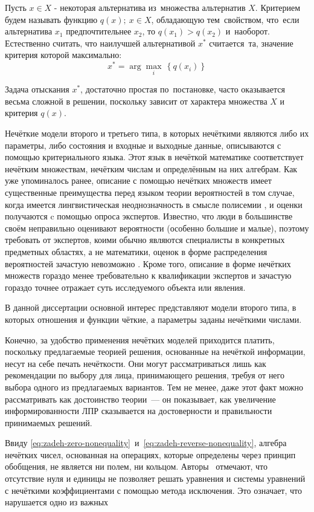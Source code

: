 Пусть $x\in X$ - некоторая альтернатива из~множества альтернатив $X$. Критерием будем называть функцию $q\left( x \right);\ x\in X$, обладающую тем~свойством, что~если альтернатива ${x_1}$ предпочтительнее ${x_2}$, то $q\left( x_1 \right)>q\left( x_2 \right)$ и~наоборот. Естественно считать, что наилучшей альтернативой ${{x}^{*}}$ считается~та, значение критерия которой максимально:
\[
	x^{*}=\arg \underset{i}{\mathop{\max }}\,\left\{ q\left( x_i \right) \right\}
\]

Задача отыскания $x^{*}$, достаточно простая по~постановке, часто оказывается весьма сложной в решении, поскольку зависит от характера множества $X$ и критерия $q\left( x \right)$. 

Нечёткие модели второго и третьего типа, в которых нечёткими являются либо их параметры, либо состояния и входные и выходные данные, описываются с помощью критериального языка. Этот язык в нечёткой математике соответствует нечётким множествам, нечётким числам и определённым на них алгебрам. Как уже упоминалось ранее, описание с помощью нечётких множеств имеет существенные преимущества перед языком теории вероятностей в том случае, когда имеется лингвистическая неоднозначность в смысле полисемии \cite{Borisov_Alexeev_Msk}, и оценки получаются c помощью опроса экспертов. Известно, что люди в большинстве своём неправильно оценивают вероятности (особенно большие и малые), поэтому требовать от экспертов, коими обычно являются специалисты в конкретных предметных областях, а не математики, оценок в форме распределения вероятностей зачастую невозможно \cite{Gubko}. Кроме того, описание в форме нечётких множеств гораздо менее требовательно к квалификации экспертов и зачастую гораздо точнее отражает суть исследуемого объекта или явления. 

В данной диссертации основной интерес представляют модели второго типа, в которых отношения и функции чёткие, а параметры заданы нечёткими числами. 

Конечно, за удобство применения нечётких моделей приходится платить, поскольку предлагаемые теорией решения, основанные на нечёткой информации, несут на себе печать нечёткости. Они могут рассматриваться лишь как рекомендации по выбору для лица, принимающего решения, требуя от него выбора одного из предлагаемых вариантов. Тем не менее, даже этот факт можно рассматривать как достоинство теории~--- он показывает, как увеличение информированности ЛПР сказывается на достоверности и правильности принимаемых решений.

Ввиду \eqref{eq:zadeh-zero-nonequality}~и~\eqref{eq:zadeh-reverse-nonequality}, алгебра нечётких чисел, основанная на операциях, которые определены через принцип обобщения, не является ни полем, ни кольцом. Авторы~\cite{Rutkovskaya} отмечают, что отсутствие нуля и единицы не позволяет решать уравнения и системы уравнений с нечёткими коэффициентами с помощью метода исключения. Это означает, что нарушается одно из важных


